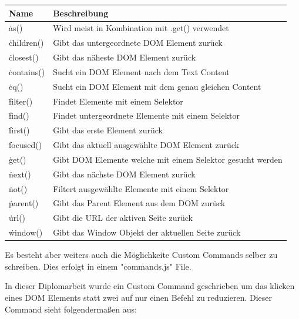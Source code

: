 \begin{center}
    \begin{tabular}{ | m{2cm} | m{13cm} | } 
        \hline
        Name & Beschreibung \\ [0.5ex] 
        \hline\hline
        \.as() & Wird meist in Kombination mit .get() verwendet \\
        \hline
        \.children() & Gibt das untergeordnete DOM Element zurück \\
        \hline
        \.closest() & Gibt das näheste DOM Element zurück \\
        \hline
        \.contains() & Sucht ein DOM Element nach dem Text Content \\
        \hline
        \.eq() & Sucht ein DOM Element mit dem genau gleichen Content  \\
        \hline
        \.filter() & Findet Elemente mit einem Selektor \\
        \hline
        \.find() & Findet untergeordnete Elemente mit einem Selektor \\
        \hline
        \.first() & Gibt das erste Element zurück \\
        \hline
        \.focused() & Gibt das aktuell ausgewählte DOM Element zurück \\
        \hline
        \.get() & Gibt DOM Elemente welche mit einem Selektor gesucht werden \\
        \hline
        \.next() & Gibt das nächste DOM Element zurück \\
        \hline
        \.not() & Filtert ausgewählte Elemente mit einem Selektor \\
        \hline
        \.parent() & Gibt das Parent Element aus dem DOM zurück \\
        \hline
        \.url() & Gibt die URL der aktiven Seite zurück \\
        \hline
        \.window() & Gibt das Window Objekt der aktuellen Seite zurück  \\
        \hline
    \end{tabular}
\end{center}

Es besteht aber weiters auch die Möglichkeite Custom Commands selber zu schreiben.
Dies erfolgt in einem "commands.js" File.

In dieser Diplomarbeit wurde ein Custom Command geschrieben um das klicken eines DOM Elements statt zwei auf nur einen Befehl zu reduzieren. Dieser Command sieht folgendermaßen aus:


